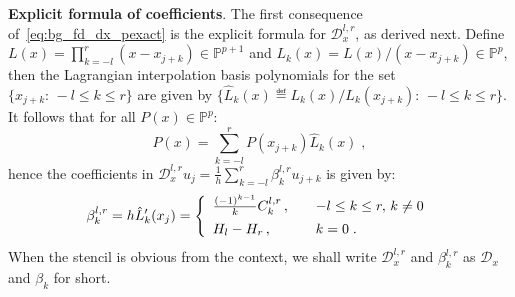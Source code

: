 \medskip

\noindent
{\bf Explicit formula of coefficients}.
The first consequence of~\cref{eq:bg_fd_dx_pexact} is the explicit formula for $\mathcal{D}^{l,r}_x$, as derived next.
Define $L(x)=\prod_{k=-l}^r(x-x_{j+k})\in\mathbb{P}^{p+1}$ and $L_k(x)=L(x)/(x-x_{j+k})\in\mathbb{P}^p$, then the Lagrangian interpolation basis polynomials for the set $\{x_{j+k}:\,-l\le k\le r\}$ are given by $\{\hat{L}_k(x)\eqdef L_k(x)/L_k(x_{j+k}):\,-l\le k\le r\}$.
It follows that for all $P(x)\in\mathbb{P}^p$:
\begin{displaymath}
  P(x) = \sum_{k=-l}^rP(x_{j+k})\hat{L}_k(x)\;,
\end{displaymath}
hence the coefficients in $\mathcal{D}^{l,r}_xu_j=\frac{1}{h}\sum_{k=-l}^r\beta_k^{l,r}u_{j+k}$ is given by:
\begin{equation}\label{eq:bg_fd_dx_coef}
  \beta_k^{l,r} = h\hat{L}_k'(x_j) = \left\{\begin{array}{lcl}
    \frac{(-1)^{k-1}}{k}C_k^{l,r}\,, & & -l\le k\le r,\,k\ne0 \\ \vspace{-.1in} \\
    H_l-H_r\,, & & k=0\;.
  \end{array}\right.
\end{equation}
When the stencil is obvious from the context, we shall write $\mathcal{D}_x^{l,r}$ and $\beta^{l,r}_k$ as $\mathcal{D}_x$ and $\beta_k$ for short.

\medskip

